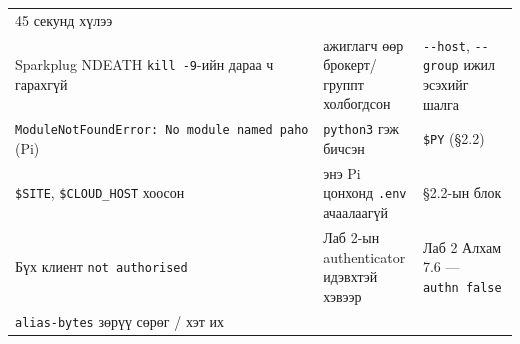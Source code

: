 \begin{longtable}[]{@{}lll@{}}
\begin{minipage}[t]{0.30\columnwidth}
45 секунд хүлээ\strut
\end{minipage}\tabularnewline
\begin{minipage}[t]{0.30\columnwidth}\raggedright
Sparkplug NDEATH \texttt{kill\ -9}-ийн дараа ч гарахгүй\strut
\end{minipage} & \begin{minipage}[t]{0.30\columnwidth}\raggedright
ажиглагч өөр брокерт/группт холбогдсон\strut
\end{minipage} & \begin{minipage}[t]{0.30\columnwidth}\raggedright
\texttt{-\/-host}, \texttt{-\/-group} ижил эсэхийг шалга\strut
\end{minipage}\tabularnewline
\begin{minipage}[t]{0.30\columnwidth}\raggedright
\texttt{ModuleNotFoundError:\ No\ module\ named\ \textquotesingle{}paho\textquotesingle{}} (Pi)\strut
\end{minipage} & \begin{minipage}[t]{0.30\columnwidth}\raggedright
\texttt{python3} гэж бичсэн\strut
\end{minipage} & \begin{minipage}[t]{0.30\columnwidth}\raggedright
\texttt{\$PY} (§2.2)\strut
\end{minipage}\tabularnewline
\begin{minipage}[t]{0.30\columnwidth}\raggedright
\texttt{\$SITE}, \texttt{\$CLOUD\_HOST} хоосон\strut
\end{minipage} & \begin{minipage}[t]{0.30\columnwidth}\raggedright
энэ Pi цонхонд \texttt{.env} ачаалаагүй\strut
\end{minipage} & \begin{minipage}[t]{0.30\columnwidth}\raggedright
§2.2-ын блок\strut
\end{minipage}\tabularnewline
\begin{minipage}[t]{0.30\columnwidth}\raggedright
Бүх клиент \texttt{not\ authorised}\strut
\end{minipage} & \begin{minipage}[t]{0.30\columnwidth}\raggedright
Лаб 2-ын authenticator идэвхтэй хэвээр\strut
\end{minipage} & \begin{minipage}[t]{0.30\columnwidth}\raggedright
Лаб 2 Алхам 7.6 --- \texttt{authn\ false}\strut
\end{minipage}\tabularnewline
\begin{minipage}[t]{0.30\columnwidth}\raggedright
\texttt{alias-bytes} зөрүү сөрөг / хэт их\strut

\end{minipage}
\end{longtable}
